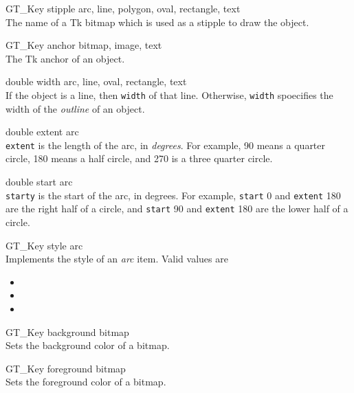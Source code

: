 \documentclass[twoside,fleqn]{report}
\begin{document}
\begin{CAttributes}
  \item[GT\_Key stipple] \hfill
  {\footnotesize arc, line, polygon, oval, rectangle, text} \\
  The name of a Tk bitmap which is used as a stipple to draw the 
  object.
      
  \item[GT\_Key anchor] \hfill
  {\footnotesize bitmap, image, text} \\
  The Tk anchor of an object.
      
  \item[double width] \hfill
  {\footnotesize arc, line, oval, rectangle, text} \\
  If the object is a line, then \texttt{width} of that line.  
  Otherwise, \texttt{width} spoecifies the width of the \emph{outline} 
  of an object.

  \item[double extent] \hfill
  {\footnotesize arc} \\
  \texttt{extent} is the length of the arc, 
  in \emph{degrees}. For example, 90 means a quarter circle, 180 means 
  a half circle, and 270 is a three quarter circle.
      
  \item[double start] \hfill
  {\footnotesize arc} \\
  \texttt{starty} is the start of the 
  arc, in degrees.  For example, \texttt{start} 0 and \texttt{extent} 
  180 are the right half of a circle, and \texttt{start} 90 and 
  \texttt{extent} 180 are the lower half of a circle.

  \item[GT\_Key style] \hfill
  {\footnotesize arc} \\
  Implements the style of an \emph{arc} item. Valid values are
  \begin{itemize}
  \item {}
  \item {} 
  \item {}
  \end{itemize}
  
  \item[GT\_Key background] \hfill
  {\footnotesize bitmap} \\
  Sets the background color of a bitmap.

  \item[GT\_Key foreground] \hfill
  {\footnotesize bitmap} \\
  Sets the foreground color of a bitmap.
      

\end{CAttributes}
\end{document}
